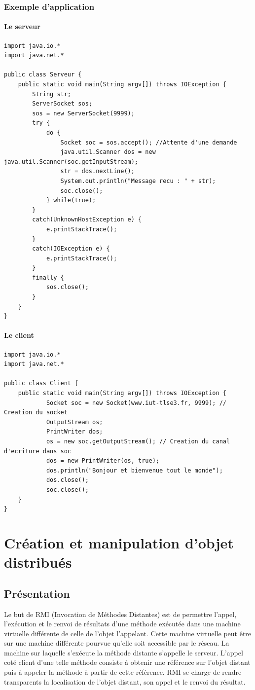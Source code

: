 \documentclass[a4paper,11pt]{report}
\begin{document}
\subsection{Exemple d\rq{}application}
\subsubsection{Le serveur}
\begin{lstlisting}
import java.io.*
import java.net.*

public class Serveur {
	public static void main(String argv[]) throws IOException {
		String str;
		ServerSocket sos;
		sos = new ServerSocket(9999);
		try {
			do {
				Socket soc = sos.accept(); //Attente d'une demande
				java.util.Scanner dos = new java.util.Scanner(soc.getInputStream);
				str = dos.nextLine();
				System.out.println("Message recu : " + str);
				soc.close();
			} while(true);
		}
		catch(UnknownHostException e) {
			e.printStackTrace();
		}
		catch(IOException e) {
			e.printStackTrace();
		}
		finally {
			sos.close();
		}
	}
}
\end{lstlisting}

\subsubsection{Le client}
\begin{lstlisting}
import java.io.*
import java.net.*

public class Client {
	public static void main(String argv[]) throws IOException {
			Socket soc = new Socket(www.iut-tlse3.fr, 9999); // Creation du socket
			OutputStream os;
			PrintWriter dos;
			os = new soc.getOutputStream(); // Creation du canal d'ecriture dans soc
			dos = new PrintWriter(os, true);
			dos.println("Bonjour et bienvenue tout le monde");
			dos.close();
			soc.close();
	}
}
\end{lstlisting}


\chapter{Création et manipulation d\rq{}objet distribués}

\section{Présentation}
Le but de RMI (Invocation de Méthodes Distantes) est de permettre l\rq{}appel, l\rq{}exécution et le renvoi de résultats d\rq{}une méthode exécutée dans une machine virtuelle différente de celle de l\rq{}objet l\rq{}appelant. Cette machine virtuelle peut être sur une machine différente pourvue qu\rq{}elle soit accessible par le réseau. La machine sur laquelle s\rq{}exécute la méthode distante s\rq{}appelle le serveur. L\rq{}appel coté client d\rq{}une telle méthode consiste à obtenir une référence sur l\rq{}objet distant puis à appeler la méthode à partir de cette référence. RMI se charge de rendre transparents la localisation de l\rq{}objet distant, son appel et le renvoi du résultat.
\end{document}
